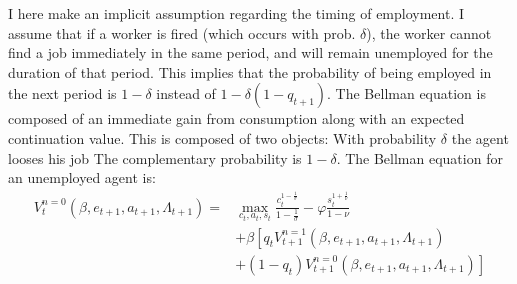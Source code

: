 I here make an implicit assumption regarding the timing of employment. I assume that if a worker is fired (which occurs with prob. $\delta$), the worker cannot find a job immediately in the same period, and will remain unemployed for the duration of that period. This implies that the probability of being employed in the next period is $1-\delta$ instead of $1-\delta\left(1-q_{t+1}\right)$. 
The Bellman equation  is composed of an immediate gain from consumption along with an expected continuation value. This is composed of two objects: With probability $\delta$ the agent looses his job The complementary probability is $1-\delta$. 
The Bellman equation for an unemployed agent is:
\begin{align*}
V_{t}^{n=0}\left(\beta,e_{t+1},a_{t+1},\Lambda_{t+1}\right)=&\max_{c_{t},a_{t},s_{t}}\frac{c_{t}^{1-\frac{1}{\sigma}}}{1-\frac{1}{\sigma}}-\varphi\frac{s_{t}^{1+\frac{1}{\nu}}}{1-\nu}\\
&+\beta\left[q_{t}V_{t+1}^{n=1}\left(\beta,e_{t+1},a_{t+1},\Lambda_{t+1}\right)\right. \\
&\left.+\left(1-q_{t}\right)V_{t+1}^{n=0}\left(\beta,e_{t+1},a_{t+1},\Lambda_{t+1}\right)\right]  
\end{align*}




